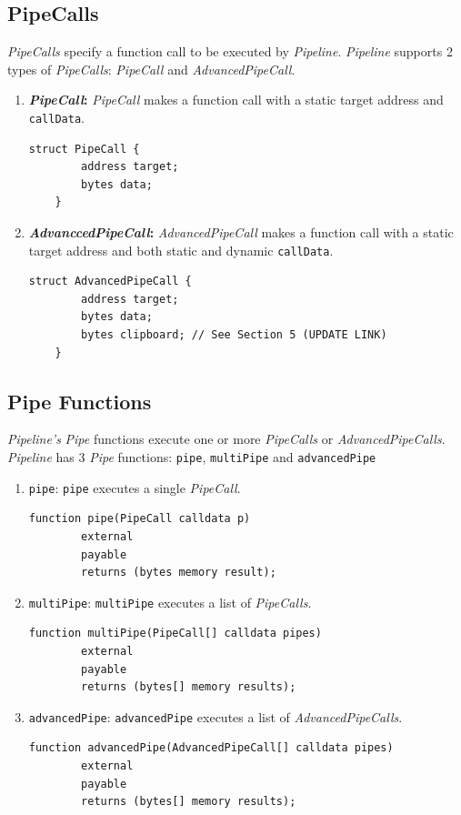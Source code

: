 \documentclass[tikz]{article}
\newcommand{\code}[1]{\texttt{#1}}
\newcommand{\term}[1]{\textsl{#1}}
\begin{document}
\newpage
\subsection{PipeCalls}
\term{PipeCalls} specify a function call to be executed by \term{Pipeline}. \term{Pipeline} supports 2 types of \term{PipeCalls}: \term{PipeCall} and \term{AdvancedPipeCall}.

\begin{enumerate}
    \item \textbf{\term{PipeCall}:} \term{PipeCall} makes a function call with a static target address and \code{callData}.
    \begin{lstlisting}[language=Solidity]
    struct PipeCall {
        address target;
        bytes data;
    }
    \end{lstlisting}

    \item \textbf{\term{AdvanccedPipeCall}:} \term{AdvancedPipeCall} makes a function call with a static target address and both static and dynamic \code{callData}.
    \begin{lstlisting}[language=Solidity]
    struct AdvancedPipeCall {
        address target;
        bytes data;
        bytes clipboard; // See Section 5 (UPDATE LINK)
    }
    \end{lstlisting}

\end{enumerate}

\subsection{Pipe Functions}
\term{Pipeline's} \term{Pipe} functions execute one or more \term{PipeCalls} or \term{AdvancedPipeCalls}. \term{Pipeline} has 3 \term{Pipe} functions: \code{pipe}, \code{multiPipe} and \code{advancedPipe}

\begin{enumerate}
    \item \code{pipe}: \code{pipe} executes a single \term{PipeCall}.
    \begin{lstlisting}[language=Solidity]
    function pipe(PipeCall calldata p)
        external
        payable
        returns (bytes memory result);
    \end{lstlisting}
    \item \code{multiPipe}: \code{multiPipe} executes a list of \term{PipeCalls}.
    \begin{lstlisting}[language=Solidity]
    function multiPipe(PipeCall[] calldata pipes)
        external
        payable
        returns (bytes[] memory results);
    \end{lstlisting}
    \item \code{advancedPipe}: \code{advancedPipe} executes a list of \term{AdvancedPipeCalls}.
    \begin{lstlisting}[language=Solidity]
    function advancedPipe(AdvancedPipeCall[] calldata pipes)
        external
        payable
        returns (bytes[] memory results);
    \end{lstlisting}
\end{enumerate}
\end{document}

